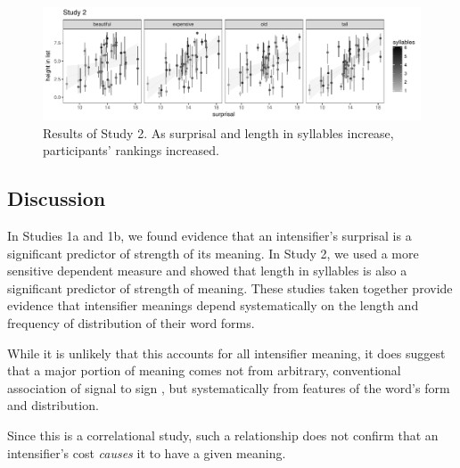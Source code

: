 \documentclass[10pt,letterpaper]{article}
\begin{document}
\begin{figure}[hbt]
\begin{center}
\includegraphics[width=\textwidth]{images/plot_study2.pdf}
\end{center}
\caption{Results of Study 2. As surprisal and length in syllables increase, participants' rankings increased.} 
\label{fig:plot_study2}
\end{figure}

\subsection{Discussion}

In Studies 1a and 1b, we found evidence that an intensifier's surprisal is a significant predictor of strength of its meaning. In Study 2, we used a more sensitive dependent measure and showed that length in syllables is also a significant predictor of strength of meaning.
These studies taken together provide evidence that intensifier meanings depend systematically on the length and frequency of distribution of their word forms.

While it is unlikely that this accounts for all intensifier meaning, it does suggest that a major portion of meaning comes not from arbitrary, conventional association of signal to sign \cite{de_saussure_nature_1916}, but systematically from features of the word's form and distribution.

Since this is a correlational study, such a relationship does not confirm that an intensifier's cost \emph{causes} it to have a given meaning.
\end{document}
